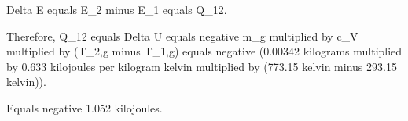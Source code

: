 Delta E equals E_2 minus E_1 equals Q_12.  

Therefore, Q_12 equals Delta U equals negative m_g multiplied by c_V multiplied by (T_2,g minus T_1,g) equals negative (0.00342 kilograms multiplied by 0.633 kilojoules per kilogram kelvin multiplied by (773.15 kelvin minus 293.15 kelvin)).  

Equals negative 1.052 kilojoules.